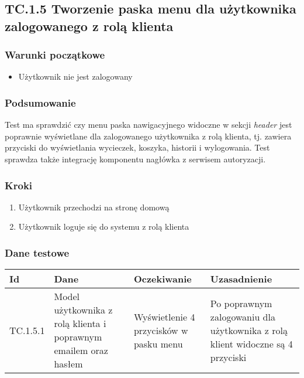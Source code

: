 \documentclass[a4paper,15pt]{article}
\begin{document}
\newpage
\begin{framed}
\subsection{TC.1.5 Tworzenie paska menu dla użytkownika zalogowanego z rolą klienta}


\vspace{0.5cm}

\subsubsection{Warunki początkowe}
\begin{itemize}
\item Użytkownik nie jest zalogowany
\end{itemize}

\subsubsection{Podsumowanie}
Test ma sprawdzić czy menu paska nawigacyjnego widoczne w sekcji \textit{header} jest poprawnie wyświetlane dla zalogowanego użytkownika z rolą klienta, tj. zawiera przyciski do wyświetlania wycieczek, koszyka, historii i wylogowania.  Test sprawdza także integrację komponentu nagłówka z serwisem autoryzacji. 

\subsubsection{Kroki}
\begin{enumerate}
\item Użytkownik przechodzi na stronę domową
\item Użytkownik loguje się do systemu z rolą klienta
\end{enumerate}

\subsubsection{Dane testowe}

\begin{center}
\begin{tabular}{ |C{1.5cm}|C{3cm}|C{4cm}|C{4cm}| } 
 \hline
 \textbf{Id} & \textbf{Dane} & \textbf{Oczekiwanie} & \textbf{Uzasadnienie} \\ \hline
 TC.1.5.1 & Model użytkownika z rolą klienta i poprawnym emailem oraz hasłem & Wyświetlenie 4 przycisków w pasku menu & Po poprawnym zalogowaniu dla użytkownika z rolą klient widoczne są 4 przyciski \\ \hline
\end{tabular}
\end{center}

\end{framed}
\end{document}
